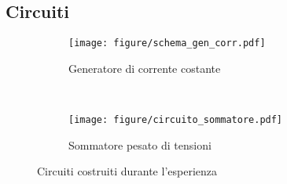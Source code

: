 \subsection{Circuiti}

\begin{figure}[h]
        \centering
        \begin{subfigure}[b]{0.48\textwidth}
                \texttt{[image: figure/schema\_gen\_corr.pdf]}
                \caption{Generatore di corrente costante}
                \label{fig:generatore}
        \end{subfigure}
        ~
        \begin{subfigure}[b]{0.48\textwidth}
                \texttt{[image: figure/circuito\_sommatore.pdf]}
                \caption{Sommatore pesato di tensioni}
                \label{fig:sommatore}
        \end{subfigure}
        \caption{Circuiti costruiti durante l'esperienza}
        \label{fig:circuits}
\end{figure}

